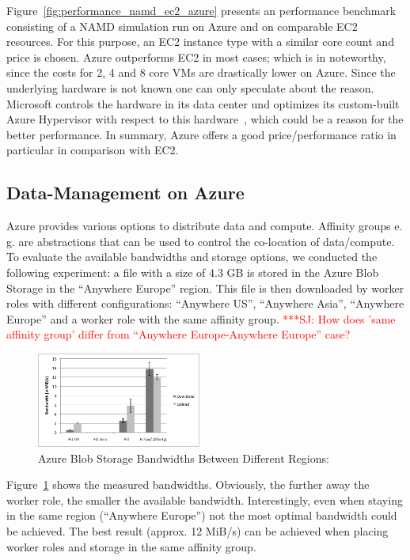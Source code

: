 \documentclass[conference,final]{IEEEtran}
\newcommand{\jhanote}[1]{ {\textcolor{red} { ***SJ: #1 }}}
\newcommand{\jhanote}[1]{}
\begin{document}
Figure~\ref{fig:performance_namd_ec2_azure} presents an performance 
benchmark consisting of a NAMD simulation run on Azure and on comparable 
EC2 resources. For this purpose, an EC2 instance type with a similar core
count and price is chosen. Azure outperforms EC2 in most cases;
which is in noteworthy, since the costs for 2, 4 and 8 core VMs are
drastically lower on Azure. Since the underlying hardware is not known
one can only speculate about the reason. Microsoft controls the
hardware in its data center und optimizes its custom-built Azure
Hypervisor with respect to this hardware~\cite{Krishnan:2010nx}, which
could be a reason for the better performance. In summary, Azure offers
a good price/performance ratio in particular in comparison with EC2.

\subsection{Data-Management on Azure}

Azure provides various options to distribute data and
compute. Affinity groups e.\,g.  are abstractions that can be used to
control the co-location of data/compute. To evaluate the available
bandwidths and storage options, we conducted the following experiment:
a file with a size of 4.3 GB is stored in the Azure Blob Storage in
the ``Anywhere Europe'' region. This file is then downloaded by worker
roles with different configurations: ``Anywhere US'', ``Anywhere
Asia'', ``Anywhere Europe'' and a worker role with the same affinity
group. \jhanote{How does 'same affinity group' differ from ``Anywhere
  Europe-Anywhere Europe'' case?}

\begin{figure}[htbp]
    \centering
        \includegraphics[width=0.48\textwidth]{performance/azure-data-transfer.pdf}
    \caption{Azure Blob Storage Bandwidths Between Different Regions: }
    \label{fig:performance_azure-data-transfer}
\end{figure}
Figure~\ref{fig:performance_azure-data-transfer} shows the measured
bandwidths. Obviously, the further away the worker role, the smaller
the available bandwidth. Interestingly, even when staying in the same
region (``Anywhere Europe'') not the most optimal bandwidth could be
achieved. The best result (approx. 12 MiB/s) can be achieved when
placing worker roles and storage in the same affinity group.
\end{document}
